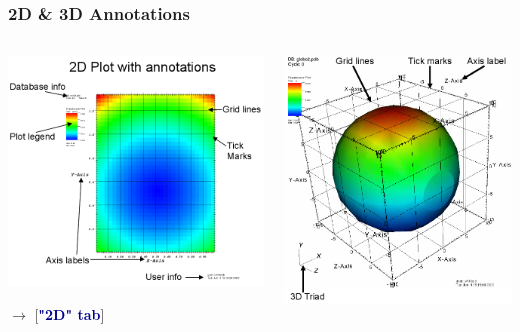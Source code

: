 \begin{frame}
\frametitle{2D \& 3D Annotations}
\begin{columns}
\begin{column}{5.75cm}
	\includegraphics[width=\columnwidth]{figs/visit-guis/visit_2d-objects}

	\vspace{2mm}
	\textcolor{DarkBlue}{}
         $\rightarrow$ 
		[\textcolor{DarkBlue}{\bf "2D" tab}]
\end{column}
\begin{column}{5.25cm}
        \includegraphics[width=\columnwidth]{figs/visit-guis/visit_3d-objects}


\end{column}
\end{columns}
\end{frame}
